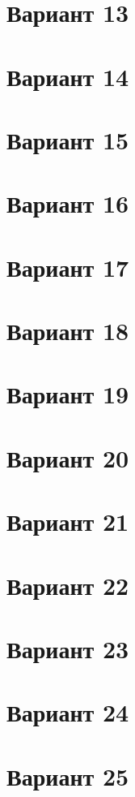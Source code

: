 \documentclass[12pt]{article}
\begin{document}
\section{Вариант 13}

\section{Вариант 14}

\section{Вариант 15}

\section{Вариант 16}

\section{Вариант 17}

\section{Вариант 18}

\section{Вариант 19}

\section{Вариант 20}

\section{Вариант 21}

\section{Вариант 22}

\section{Вариант 23}

\section{Вариант 24}

\section{Вариант 25}
\end{document}
